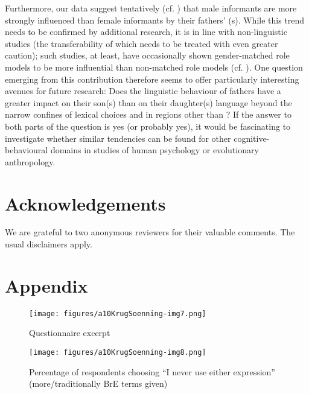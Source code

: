 \documentclass[output=paper]{langsci/langscibook}
\begin{document}
Furthermore, our data suggest tentatively (cf. ) that male informants are more strongly influenced than female informants by their fathers’ (s). While this trend needs to be confirmed by additional research, it is in line with non-linguistic studies (the transferability of which needs to be treated with even greater caution); such studies, at least, have occasionally shown gender-matched role models to be more influential than non-matched role models (cf. \citealt{Hurdetal2009}). One question emerging from this contribution therefore seems to offer particularly interesting avenues for future research: Does the linguistic behaviour of fathers have a greater impact on their son(s) than on their daughter(s) language beyond the narrow confines of lexical choices and in regions other than ? If the answer to both parts of the question is yes (or probably yes), it would be fascinating to investigate whether similar tendencies can be found for other cognitive-behavioural domains in studies of human psychology or evolutionary anthropology.

\section*{Acknowledgements}
We are grateful to two anonymous reviewers for their valuable comments. The usual disclaimers apply.


\newpage
\section*{Appendix}

\begin{figure}[h]
  \texttt{[image: figures/a10KrugSoenning-img7.png]}
  \caption{
Questionnaire excerpt}
 \label{fig:krug:app1}
\end{figure}
  
\begin{figure}[h]
  \texttt{[image: figures/a10KrugSoenning-img8.png]}
\caption{
Percentage of respondents choosing “I never use either expression” (more/traditionally {BrE} terms given)}
 \label{fig:krug:app2}
\end{figure}
\end{document}

